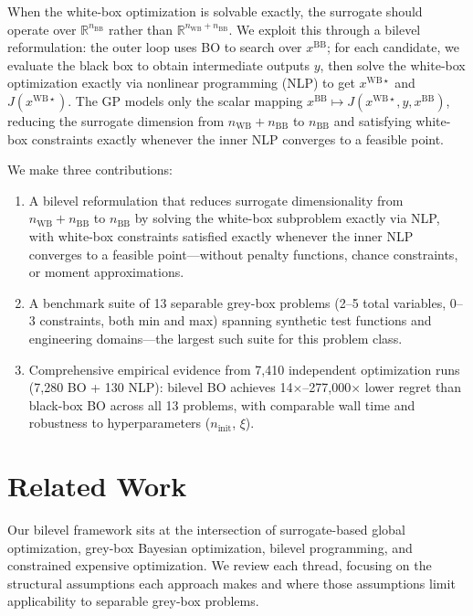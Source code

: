 \documentclass[12pt,a4paper]{article}%
\theoremstyle{plain}%
\theoremstyle{remark}%
\theoremstyle{definition}%
\def\WB{\mathrm{WB}}
\def\BB{\mathrm{BB}}
\begin{document}
When the white-box optimization is solvable exactly, the surrogate should operate over $\mathbb{R}^{n_{\BB}}$ rather than $\mathbb{R}^{n_{\WB}+n_{\BB}}$. We exploit this through a bilevel reformulation: the outer loop uses BO to search over $x^{\BB}$; for each candidate, we evaluate the black box to obtain intermediate outputs $y$, then solve the white-box optimization exactly via nonlinear programming (NLP) to get $x^{\WB\star}$ and $J(x^{\WB\star})$. The GP models only the scalar mapping $x^{\BB} \mapsto J(x^{\WB\star}, y, x^{\BB})$, reducing the surrogate dimension from $n_{\WB}+n_{\BB}$ to $n_{\BB}$ and satisfying white-box constraints exactly whenever the inner NLP converges to a feasible point.

We make three contributions:
\begin{enumerate}
    \item A bilevel reformulation that reduces surrogate dimensionality from $n_{\WB}+n_{\BB}$ to $n_{\BB}$ by solving the white-box subproblem exactly via NLP, with white-box constraints satisfied exactly whenever the inner NLP converges to a feasible point---without penalty functions, chance constraints, or moment approximations.
    \item A benchmark suite of 13 separable grey-box problems (2--5 total variables, 0--3 constraints, both min and max) spanning synthetic test functions and engineering domains---the largest such suite for this problem class.
    \item Comprehensive empirical evidence from 7{,}410 independent optimization runs (7{,}280 BO + 130 NLP): bilevel BO achieves 14$\times$--277{,}000$\times$ lower regret than black-box BO across all 13 problems, with comparable wall time and robustness to hyperparameters ($n_\text{init}$, $\xi$).
\end{enumerate}

\section{Related Work}\label{sec:related_work}

Our bilevel framework sits at the intersection of surrogate-based global optimization, grey-box Bayesian optimization, bilevel programming, and constrained expensive optimization. We review each thread, focusing on the structural assumptions each approach makes and where those assumptions limit applicability to separable grey-box problems.
\end{document}
